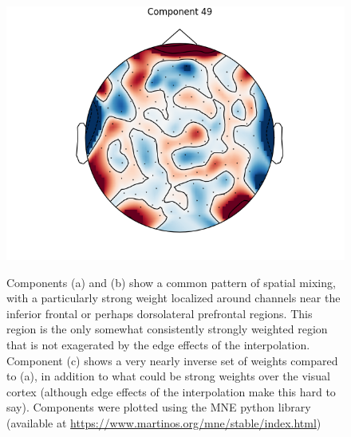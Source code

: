 \documentclass[fleqn,10pt]{wlscirep}
\begin{document}
\begin{figure}[h!]
\begin{minipage}{0.31\textwidth}
    \includegraphics[width=\linewidth]{max_act/49.png}
    \subcaption{}
    \label{fig:component_49}
  \end{minipage}
  \caption[textfind]{Components (a) and (b) show a common pattern of spatial mixing, with a particularly strong weight localized around channels near the inferior frontal or perhaps dorsolateral prefrontal regions. This region is the only somewhat consistently strongly weighted region that is not exagerated by the edge effects of the interpolation. Component (c) shows a very nearly inverse set of weights compared to (a), in addition to what could be strong weights over the visual cortex (although edge effects of the interpolation make this hard to say). Components were plotted using the MNE python library (available at \url{https://www.martinos.org/mne/stable/index.html})} \label{fig:max_components}
\end{figure}

\end{document}
